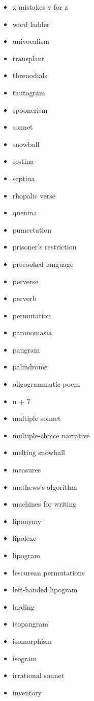 \begin{multicols}{3}\raggedright
\begin{itemize}
  \item x mistakes y for z
  \item word ladder
  \item univocalism
  \item transplant
  \item threnodials
  \item tautogram
  \item spoonerism
  \item sonnet
  \item snowball
  \item sestina
  \item septina
  \item rhopalic verse
  \item quenina
  \item pumectation
  \item prisoner's restriction
  \item precooked language
  \item perverse
  \item perverb
  \item permutation
  \item paronomasia
  \item pangram
  \item palindrome
  \item oligogrammatic poem
  \item n + 7
  \item multiple sonnet
  \item multiple-choice narrative
  \item melting snowball
  \item measures
  \item mathews's algorithm
  \item machines for writing
  \item liponymy
  \item lipolexe
  \item lipogram
  \item lescurean permutations
  \item left-handed lipogram
  \item larding
  \item isopangram
  \item isomorphism
  \item isogram
  \item irrational sonnet
  \item inventory

\end{itemize}
\end{multicols}
